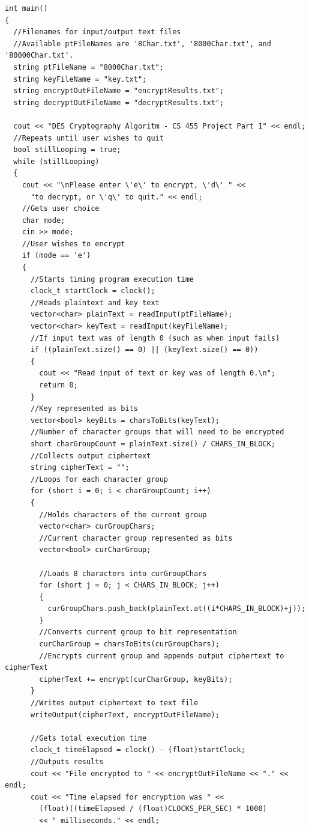 \documentclass[11pt]{article}
\begin{document}
\begin{verbatim}
int main()
{
  //Filenames for input/output text files
  //Available ptFileNames are '8Char.txt', '8000Char.txt', and '80000Char.txt'.
  string ptFileName = "8000Char.txt";
  string keyFileName = "key.txt";
  string encryptOutFileName = "encryptResults.txt";
  string decryptOutFileName = "decryptResults.txt";

  cout << "DES Cryptography Algoritm - CS 455 Project Part 1" << endl;
  //Repeats until user wishes to quit
  bool stillLooping = true;
  while (stillLooping)
  {
    cout << "\nPlease enter \'e\' to encrypt, \'d\' " <<
      "to decrypt, or \'q\' to quit." << endl;
    //Gets user choice
    char mode;
    cin >> mode;
    //User wishes to encrypt
    if (mode == 'e')
    {
      //Starts timing program execution time
      clock_t startClock = clock();
      //Reads plaintext and key text
      vector<char> plainText = readInput(ptFileName);
      vector<char> keyText = readInput(keyFileName);
      //If input text was of length 0 (such as when input fails)
      if ((plainText.size() == 0) || (keyText.size() == 0))
      {
        cout << "Read input of text or key was of length 0.\n";
        return 0;
      }
      //Key represented as bits
      vector<bool> keyBits = charsToBits(keyText);
      //Number of character groups that will need to be encrypted
      short charGroupCount = plainText.size() / CHARS_IN_BLOCK;
      //Collects output ciphertext
      string cipherText = "";
      //Loops for each character group
      for (short i = 0; i < charGroupCount; i++)
      {
        //Holds characters of the current group
        vector<char> curGroupChars;
        //Current character group represented as bits
        vector<bool> curCharGroup;

        //Loads 8 characters into curGroupChars
        for (short j = 0; j < CHARS_IN_BLOCK; j++)
        {
          curGroupChars.push_back(plainText.at((i*CHARS_IN_BLOCK)+j));
        }
        //Converts current group to bit representation
        curCharGroup = charsToBits(curGroupChars);
        //Encrypts current group and appends output ciphertext to cipherText
        cipherText += encrypt(curCharGroup, keyBits);
      }
      //Writes output ciphertext to text file
      writeOutput(cipherText, encryptOutFileName);

      //Gets total execution time
      clock_t timeElapsed = clock() - (float)startClock;
      //Outputs results
      cout << "File encrypted to " << encryptOutFileName << "." << endl;
      cout << "Time elapsed for encryption was " <<
        (float)((timeElapsed / (float)CLOCKS_PER_SEC) * 1000)
        << " milliseconds." << endl;


\end{verbatim}
\end{document}
